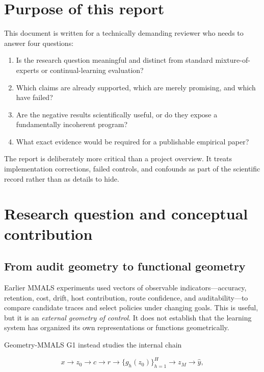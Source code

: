 \documentclass[11pt,a4paper]{article}
\begin{document}
\tableofcontents
\newpage

\section{Purpose of this report}

This document is written for a technically demanding reviewer who needs to answer four questions:

\begin{enumerate}
\item Is the research question meaningful and distinct from standard mixture-of-experts or continual-learning evaluation?
\item Which claims are already supported, which are merely promising, and which have failed?
\item Are the negative results scientifically useful, or do they expose a fundamentally incoherent program?
\item What exact evidence would be required for a publishable empirical paper?
\end{enumerate}

The report is deliberately more critical than a project overview. It treats implementation corrections, failed controls, and confounds as part of the scientific record rather than as details to hide.

\section{Research question and conceptual contribution}

\subsection{From audit geometry to functional geometry}

Earlier MMALS experiments used vectors of observable indicators---accuracy, retention, cost, drift, host contribution, route confidence, and auditability---to compare candidate traces and select policies under changing goals. This is useful, but it is an \emph{external geometry of control}. It does not establish that the learning system has organized its own representations or functions geometrically.

Geometry-MMALS G1 instead studies the internal chain

\begin{equation}
 x \longrightarrow z_0 \longrightarrow c \longrightarrow r
 \longrightarrow \{g_h(z_0)\}_{h=1}^{H}
 \longrightarrow z_M \longrightarrow \hat y,
\end{equation}
\end{document}

